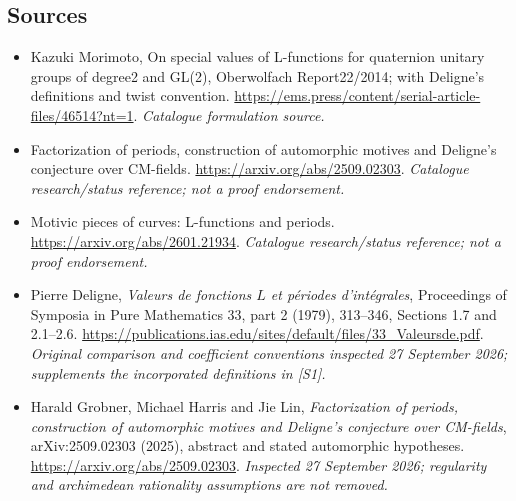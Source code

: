 \documentclass[11pt,a4paper]{article}
\numberwithin{equation}{section}
\begin{document}
\subsection{Sources}
\begin{itemize}\raggedright
\item[\textnormal{[S1]}]\hypertarget{source:statement:1}{} Kazuki Morimoto, On special values of L-functions for quaternion unitary groups of degree2 and GL(2), Oberwolfach Report22/2014; with Deligne's definitions and twist convention.
\url{https://ems.press/content/serial-article-files/46514?nt=1}.
{\small\textit{Catalogue formulation source.}}
\item[\textnormal{[S2]}]\hypertarget{source:statement:2}{} Factorization of periods, construction of automorphic motives and Deligne's conjecture over CM-fields.
\url{https://arxiv.org/abs/2509.02303}.
{\small\textit{Catalogue research/status reference; not a proof endorsement.}}
\item[\textnormal{[S3]}]\hypertarget{source:statement:3}{} Motivic pieces of curves: L-functions and periods.
\url{https://arxiv.org/abs/2601.21934}.
{\small\textit{Catalogue research/status reference; not a proof endorsement.}}
\item[\textnormal{[E1]}]\hypertarget{extra:statement:1}{} Pierre Deligne,
\emph{Valeurs de fonctions $L$ et p\'eriodes d'int\'egrales},
Proceedings of Symposia in Pure Mathematics 33, part 2 (1979), 313--346,
Sections 1.7 and 2.1--2.6.
\url{https://publications.ias.edu/sites/default/files/33_Valeursde.pdf}.
{\small\textit{Original comparison and coefficient conventions inspected
27 September 2026; supplements the incorporated definitions in [S1].}}
\item[\textnormal{[E2]}]\hypertarget{extra:statement:2}{} Harald Grobner,
Michael Harris and Jie Lin, \emph{Factorization of periods, construction of
automorphic motives and Deligne's conjecture over CM-fields},
arXiv:2509.02303 (2025), abstract and stated automorphic hypotheses.
\url{https://arxiv.org/abs/2509.02303}.
{\small\textit{Inspected 27 September 2026; regularity and archimedean
rationality assumptions are not removed.}}
\end{itemize}
\end{document}
